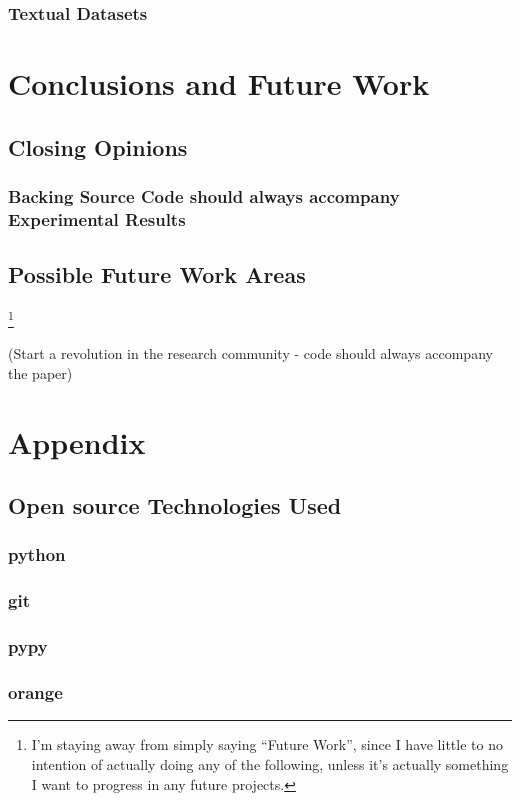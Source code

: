 \documentclass[a4paper,11pt]{report}
\begin{document}
\subsection{Textual Datasets}

\chapter{Conclusions and Future Work\label{cha:conclusions}}

\section{Closing Opinions}
\subsection{Backing Source Code should always accompany Experimental Results}

\section{Possible Future Work Areas} \footnote{I'm staying away from simply saying ``Future Work'', since I have little to no intention of actually doing any of the following, unless it's actually something I want to progress in any future projects.}



(Start a revolution in the research community - code should always accompany the paper)

\chapter{Appendix}
\section{Open source Technologies Used}
\subsection*{python}
\subsection*{git}
\subsection*{pypy}
\subsection*{orange}
\end{document}
